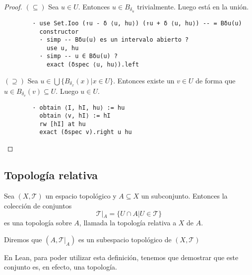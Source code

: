 \begin{proof}
  $(\subseteq)$ Sea $u \in U$. Entonces $u \in B_{\delta_u}$ trivialmente. Luego está en la unión.

  \begin{lstlisting}
        · use Set.Ioo (↑u - δ ⟨u, hu⟩) (↑u + δ ⟨u, hu⟩) -- = Bδu(u)
          constructor
          · simp -- Bδu(u) es un intervalo abierto ?
            use u, hu
          · simp -- u ∈ Bδu(u) ?
            exact (δspec ⟨u, hu⟩).left \end{lstlisting}

  $(\supseteq)$ Sea $u \in \bigcup \{B_{\delta_x}(x) | x \in U\}$. Entonces existe un $v \in U$ de forma que $u \in B_{\delta_v}(v) \subseteq U$. Luego $u \in U$.

  \begin{lstlisting}
        · obtain ⟨I, hI, hu⟩ := hu
          obtain ⟨v, hI⟩ := hI
          rw [hI] at hu
          exact (δspec v).right u hu \end{lstlisting}
  
\end{proof}

\subsection{Topología relativa}

\begin{definition}
  Sea $(X, \mathcal{T})$ un espacio topológico y $A \subseteq X$ un subconjunto. Entonces la colección de conjuntos
  $$
  \mathcal{T}|_A = \{U \cap A | U \in \mathcal{T}\}
  $$
  es una topología sobre $A$, llamada la \textnormal{topología relativa} a $X$ de $A$.

  Diremos que $(A, \mathcal{T}|_A)$ es un \textnormal{subespacio topológico} de $(X, \mathcal{T})$
\end{definition}

En Lean, para poder utilizar esta definición, tenemos que demostrar que este conjunto es, en efecto, una topología.

